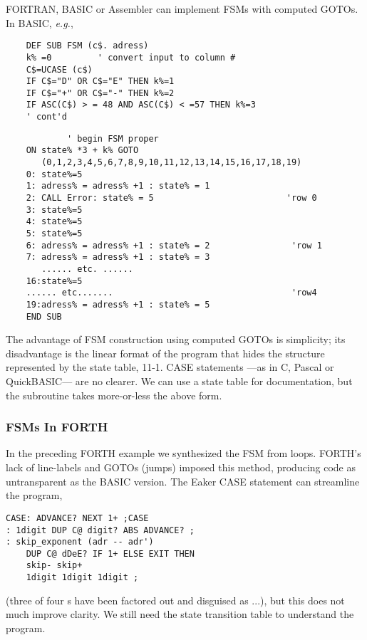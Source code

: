 FORTRAN, BASIC or Assembler can implement FSMs with computed GOTOs. In BASIC, \textit{e.g.},

\begin{verbatim}
    DEF SUB FSM (c$. adress)
    k% =0         ' convert input to column #
    C$=UCASE (c$)
    IF C$="D" OR C$="E" THEN k%=1
    IF C$="+" OR C$="-" THEN k%=2
    IF ASC(C$) > = 48 AND ASC(C$) < =57 THEN k%=3
    ' cont'd
\end{verbatim}

\begin{verbatim}
            ' begin FSM proper
    ON state% *3 + k% GOTO
       (0,1,2,3,4,5,6,7,8,9,10,11,12,13,14,15,16,17,18,19)
    0: state%=5
    1: adress% = adress% +1 : state% = 1
    2: CALL Error: state% = 5                          'row 0
    3: state%=5
    4: state%=5
    5: state%=5
    6: adress% = adress% +1 : state% = 2                'row 1
    7: adress% = adress% +1 : state% = 3
       ...... etc. ......
    16:state%=5
    ...... etc.......                                   'row4
    19:adress% = adress% +1 : state% = 5
    END SUB
\end{verbatim}

The advantage of FSM construction using computed GOTOs is simplicity; its disadvantage is the linear format of the program that hides the structure represented by the state table, 11-1. CASE statements —as in C, Pascal or QuickBASIC— are no clearer. We can use a state table for documentation, but the subroutine takes more-or-less the above form.

\subsubsection{FSMs In FORTH}
In the preceding FORTH example we synthesized the FSM from  loops. FORTH's lack of line-labels and GOTOs (jumps) imposed this method, producing code as untransparent as the BASIC version. The Eaker CASE statement can streamline the program,

\begin{lstlisting}
CASE: ADVANCE? NEXT 1+ ;CASE
: 1digit DUP C@ digit? ABS ADVANCE? ;
: skip_exponent (adr -- adr')
    DUP C@ dDeE? IF 1+ ELSE EXIT THEN
    skip- skip+
    1digit 1digit 1digit ;
\end{lstlisting}

(three of four s have been factored out and disguised as ...), but this does not much improve clarity. We still need the state transition table to understand the program.

